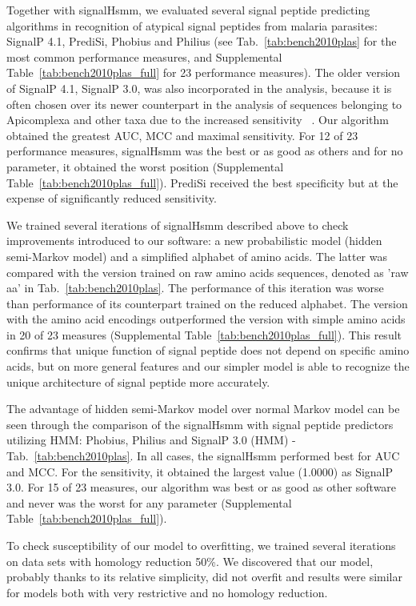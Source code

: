 \documentclass[10pt,letterpaper]{article}
\begin{document}
Together with signalHsmm, we evaluated several signal peptide predicting algorithms in recognition of atypical signal peptides from malaria parasites: SignalP 4.1, PrediSi, Phobius and Philius (see Tab.~\ref{tab:bench2010plas} for the most common performance measures, and Supplemental Table~\ref{tab:bench2010plas_full} for 23 performance measures). The older version of SignalP 4.1, SignalP 3.0, was also incorporated in the analysis, because it is often chosen over its newer counterpart in the analysis of sequences belonging to Apicomplexa and other taxa due to the increased sensitivity ~\cite{2012cilingirapicoap, sperschneider_evaluation_2015}. 
Our algorithm obtained the greatest AUC, MCC and maximal sensitivity. For 12 of 23 performance measures, signalHsmm was the best or as good as others and for no parameter, it obtained the worst position (Supplemental Table~\ref{tab:bench2010plas_full}). PrediSi received the best specificity but at the expense of significantly reduced sensitivity.

We trained several iterations of signalHsmm  described above to check improvements introduced to our software: a new probabilistic model (hidden semi-Markov model) and a simplified alphabet of amino acids. The latter was compared with the version trained on raw amino acids sequences, denoted as 'raw aa' in Tab.~\ref{tab:bench2010plas}. The performance of this iteration was  worse than performance of its counterpart trained on the reduced alphabet. The version with the amino acid encodings outperformed the version with simple amino acids in 20 of 23 measures (Supplemental Table~\ref{tab:bench2010plas_full}). This result confirms that unique function of signal peptide does not depend on specific amino acids, but on more general features and our simpler model is able to recognize the unique architecture of signal peptide more accurately.

The advantage of hidden semi-Markov model over normal Markov model can be seen through the comparison of the signalHsmm with signal peptide predictors utilizing HMM: Phobius, Philius and SignalP 3.0 (HMM) - Tab.~\ref{tab:bench2010plas}. In all cases, the signalHsmm performed best for AUC and MCC. For the sensitivity, it obtained the largest value (1.0000) as SignalP 3.0. For 15 of 23 measures, our algorithm was best or as good as other software and never was the worst for any parameter (Supplemental Table~\ref{tab:bench2010plas_full}).

To check susceptibility of our model to overfitting, we trained several iterations on data sets with homology reduction 50\%. We discovered that our model, probably thanks to its relative simplicity, did not overfit and results were similar for models both with very restrictive and no homology reduction.
\end{document}
